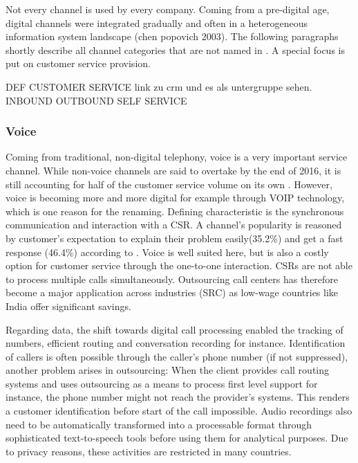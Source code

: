 		Not every channel is used by every company. Coming from a pre-digital age, digital channels were integrated gradually and often in a heterogeneous information system landscape (chen popovich 2003). The following paragraphs shortly describe all channel categories that are not named  in  \citeauthor{paynefrow2005}. A special focus is put on customer service provision. 
		
		DEF CUSTOMER SERVICE link zu crm und es als untergruppe sehen. 
		INBOUND
		OUTBOUND
		SELF SERVICE
		
		
		\subsubsection{Voice}
		
		Coming from traditional, non-digital telephony, voice is a very important service channel. While non-voice channels are said to overtake by the end of 2016, it is still accounting for half of the customer service volume on its own \cite{dimensiondata2016}. However, voice is becoming more and more digital for example through \acrfull{VOIP} technology, which is one reason for the renaming. Defining characteristic is the synchronous communication and interaction with a \acrfull{CSR}. A channel's popularity is reasoned by customer's expectation to explain their problem easily(35.2\%) and get a fast response (46.4\%) according to \cite{ocm2015}. Voice is well suited here, but is also a costly option for customer service through the one-to-one interaction. \acrshort{CSR}s are not able to process multiple calls simultaneously. Outsourcing call centers has therefore become a major application across industries (SRC) as low-wage countries like India offer significant savings. 
		
		Regarding data, the shift towards digital call processing enabled the tracking of numbers, efficient routing and conversation recording for instance. Identification of callers is often possible through the caller's phone number (if not suppressed), another problem arises in outsourcing: When the client provides call routing systems and uses outsourcing as a means to process first level support for instance, the phone number might not reach the provider's systems. This renders a customer identification before start of the call impossible. Audio recordings also need to be automatically transformed into a processable format through sophisticated text-to-speech tools before using them for analytical purposes. Due to privacy reasons, these activities are restricted in many countries. 
		
